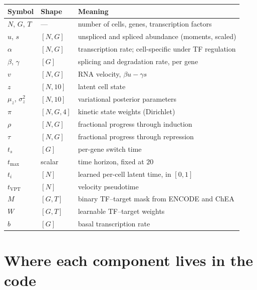\documentclass[11pt,a4paper]{article}
\newcommand{\uns}{u}
\newcommand{\spl}{s}
\newcommand{\ts}{t_{s}}
\newcommand{\tmax}{t_{\max}}
\theoremstyle{definition}
\begin{document}
\begin{center}
\begin{tabular}{@{}llp{8.2cm}@{}}
\toprule
\textbf{Symbol} & \textbf{Shape} & \textbf{Meaning} \\
\midrule
$N$, $G$, $T$ & --- & number of cells, genes, transcription factors \\
$\uns$, $\spl$ & $[N, G]$ & unspliced and spliced abundance (moments, scaled) \\
$\alpha$ & $[N, G]$ & transcription rate; cell-specific under TF regulation \\
$\beta$, $\gamma$ & $[G]$ & splicing and degradation rate, per gene \\
$v$ & $[N, G]$ & RNA velocity, $\beta \uns - \gamma \spl$ \\
\midrule
$z$ & $[N, 10]$ & latent cell state \\
$\mu_z$, $\sigma_z^2$ & $[N, 10]$ & variational posterior parameters \\
\midrule
$\pi$ & $[N, G, 4]$ & kinetic state weights (Dirichlet) \\
$\rho$ & $[N, G]$ & fractional progress through induction \\
$\tau$ & $[N, G]$ & fractional progress through repression \\
$\ts$ & $[G]$ & per-gene switch time \\
$\tmax$ & scalar & time horizon, fixed at $20$ \\
$t_i$ & $[N]$ & learned per-cell latent time, in $[0,1]$ \\
$t_{\text{VPT}}$ & $[N]$ & velocity pseudotime \\
\midrule
$M$ & $[G, T]$ & binary TF--target mask from ENCODE and ChEA \\
$W$ & $[G, T]$ & learnable TF--target weights \\
$b$ & $[G]$ & basal transcription rate \\
\bottomrule
\end{tabular}
\end{center}

\section{Where each component lives in the code}
\end{document}
